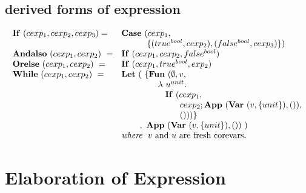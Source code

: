 \documentclass[11pt,a4paper]{article}
\newcommand{\key}[1]{\textrm{\textbf{#1}}}
\newcommand{\whereclause}[1]{\textit{where}\hspace{1.5ex}#1}
\newcommand{\braced}[1]{\{#1\}}
\newcommand{\lam}  {\mathbf\lambda}
\begin{document}
\subsection {derived forms of expression}
\[\begin{array}{ll}
  \key{If}\ (cexp_1, cexp_2, cexp_3) = & \key{Case}\ (cexp_1, \\
                                       & \hspace{7ex}\braced{(true^{bool}, cexp_2), (false^{bool}, cexp_3)})  \\
\key{Andalso}\ (cexp_1, cexp_2)\     = & \key{If}\ (cexp_1, cexp_2, false^{bool}) \\
\key{Orelse} \ (cexp_1, cexp_2)\     = & \key{If}\ (cexp_1, true^{bool}, exp_2)   \\
\key{While}  \ (cexp_1, cexp_2)\     = & \key{Let}\  (\ \braced{\key{Fun}\ (\emptyset, v, \\
                                       & \hspace{10ex}\lam\ u^{unit}. \\
                                       & \hspace{12ex}\key{If}\ (cexp_1, \\
                                       & \hspace{16ex} cexp_2;\key{App}\ (\key{Var}\ (v,\braced{unit}), ()) , \\
                                       & \hspace{16ex} ()))} \\
                                       & \hspace{5ex},\ \key{App}\ (\key{Var}\ (v,\braced{unit}),())\ ) \\
                                       & \whereclause{\textrm{$v$ and $u$ are fresh corevars.}}
\end{array}\]

\section {Elaboration of Expression}
\end{document}
